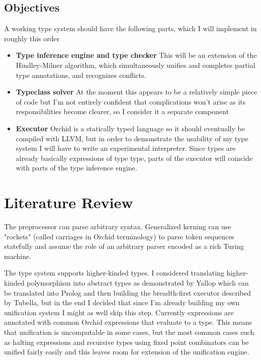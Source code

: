 \documentclass{article}
\begin{document}
\subsection{Objectives}

A working type system should have the following parts, which I will implement in roughly this order

\begin{itemize}
    \item \textbf{Type inference engine and type checker} This will be an extension of
        the Hindley-Milner algorithm, which simultaneously unifies and completes partial type
        annotations, and recognizes conflicts.
    \item \textbf{Typeclass solver} At the moment this appears to be a relatively simple piece of
        code but I'm not entirely confident that complications won't arise as its responsibilities
        become clearer, so I consider it a separate component
    \item \textbf{Executor} Orchid is a statically typed language so it should eventually be compiled
        with LLVM, but in order to demonstrate the usability of my type system I will have to write
        an experimental interpreter. Since types are already basically expressions of type type,
        parts of the executor will coincide with parts of the type inference engine.
\end{itemize}

\section{Literature Review}

The preprocessor can parse arbitrary syntax. Generalized kerning can use "rockets"
(called carriages in Orchid terminology) to parse token sequences statefully and assume
the role of an arbitrary parser encoded as a rich Turing machine.\cite{suckerpinch}

The type system supports higher-kinded types. I considered translating higher-kinded polymorphism
into abstract types as demonstrated by Yallop\cite{yallop} which can be translated into
Prolog and then building the breadth-first executor described by Tubella\cite{tubella}, but
in the end I decided that since I'm already building my own unification system I might as well
skip this step. Currently expressions are annotated with common Orchid expressions that evaluate to
a type. This means that unification is uncomputable in some cases, but the most common cases
such as halting expressions and recursive types using fixed point combinators can be unified
fairly easily and this leaves room for extension of the unification engine.
\end{document}
